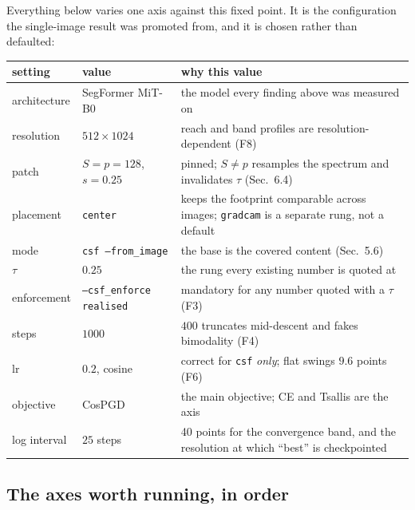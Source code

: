 \documentclass[11pt,a4paper]{article}
\begin{document}
Everything below varies one axis against this fixed point. It is the
configuration the single-image result was promoted from, and it is chosen
rather than defaulted:
\begin{center}
\small
\begin{tabular}{@{}llL{7.3cm}@{}}
\toprule
setting & value & why this value \\
\midrule
architecture & SegFormer MiT-B0 & the model every finding above was measured
   on \citep{xie2021segformer} \\
resolution & $512\times1024$ & reach and band profiles are resolution-dependent
   (F8) \\
patch & $S=p=128$, $s=0.25$ & pinned; $S\neq p$ resamples the spectrum and
   invalidates $\tau$ (Sec.~6.4) \\
placement & \texttt{center} & keeps the footprint comparable across images;
   \texttt{gradcam} is a separate rung, not a default \\
mode & \texttt{csf --from\_image} & the base is the covered content
   (Sec.~5.6) \\
$\tau$ & $0.25$ & the rung every existing number is quoted at \\
enforcement & \texttt{--csf\_enforce realised} & mandatory for any number
   quoted with a $\tau$ (F3) \\
steps & $1000$ & $400$ truncates mid-descent and fakes bimodality (F4) \\
lr & $0.2$, cosine & correct for \texttt{csf} \emph{only}; flat swings
   $9.6$ points (F6) \\
objective & CosPGD & the main objective; CE and Tsallis are the axis \\
log interval & $25$ steps & 40 points for the convergence band, and the
   resolution at which ``best'' is checkpointed \\
\bottomrule
\end{tabular}
\end{center}

\subsection{The axes worth running, in order}
\end{document}
